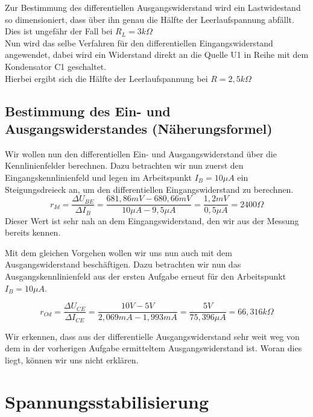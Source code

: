 \documentclass{article}
\begin{document}
Zur Bestimmung des differentiellen Ausgangswiderstand wird ein Lastwidestand so dimensioniert, dass über ihn genau die Hälfte der Leerlaufspannung abfällt.
\\ Dies ist ungefähr der Fall bei $R_L = 3k\Omega$\\
Nun wird das selbe Verfahren für den differentiellen Eingangswiderstand angewendet, dabei wird ein Widerstand direkt an die Quelle U1 in Reihe mit dem Kondensator C1 geschaltet. 
\\ Hierbei ergibt sich die Hälfte der Leerlaufspannung bei $R = 2,5k\Omega$


\subsection{Bestimmung des Ein- und Ausgangswiderstandes (Näherungsformel)}
\label{sec:bestimmung-des-ein}

Wir wollen nun den differentiellen Ein- und Ausgangswiderstand über die Kennlinienfelder berechnen. Dazu betrachten wir nun zuerst den Eingangskennlinienfeld und legen im Arbeitspunkt $I_{B} = 10\mu A$ ein Steigungsdreieck an, um den differentiellen Eingangswiderstand zu berechnen.
\begin{equation*}
  r_{Id} = \frac{\Delta U_{BE}}{\Delta I_{B}} = \frac{681,86mV - 680,66mV}{10\mu A - 9,5\mu A} = \frac{1,2mV}{0,5\mu A} = 2400\Omega
\end{equation*}
Dieser Wert ist sehr nah an dem Eingangswiderstand, den wir aus der Messung bereits kennen.

Mit dem gleichen Vorgehen wollen wir uns nun auch mit dem Ausgangswiderstand beschäftigen. Dazu betrachten wir nun das Ausgangskennlinienfeld aus der ersten Aufgabe erneut für den Arbeitspunkt $I_{B} = 10\mu A$.

\begin{equation*}
  r_{Od} = \frac{\Delta U_{CE}}{\Delta I_{CE}} = \frac{10V - 5V}{2,069mA - 1,993mA} = \frac{5V}{75,396\mu A} = 66,316k\Omega
\end{equation*}

Wir erkennen, dass aus der differentielle Ausgangswiderstand sehr weit weg von dem in der vorherigen Aufgabe ermitteltem Ausgangswiderstand ist. Woran dies liegt, können wir uns nicht erklären.
\newpage

\section{Spannungsstabilisierung}
\end{document}
